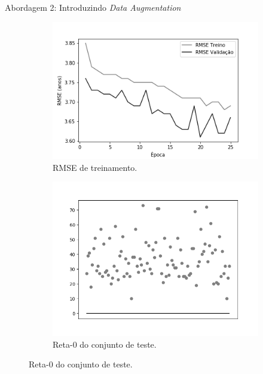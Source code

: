 \begin{frame}{Abordagem 2: Introduzindo \emph{Data Augmentation}}
  \begin{figure}[h!]
    \caption{Resultados do treinamento e teste da CNN LeNet \emph{Leaky ReLU}.}
  \begin{subfigure}[hb]{0.4\textwidth}
    \caption{RMSE de treinamento.}
    \includegraphics[width=\linewidth]{img/graficos/history/lenet/fig-history-image-treat-2-lenet-lrelu-rmse.png}
  \end{subfigure}
  \begin{subfigure}[hb]{0.4\textwidth}
    \caption{Reta-0 do conjunto de teste.}
   \includegraphics[width=\linewidth]{img/graficos/reta0/lenet/fig-reta-0-image-treat-2-lenet-lrelu.png}
  \end{subfigure}%
\end{figure}
\end{frame}

